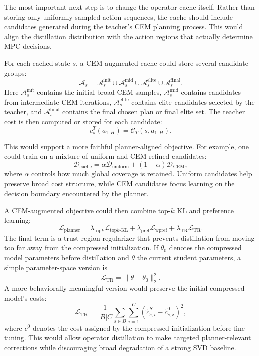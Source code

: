 \documentclass[11pt]{article}
\begin{document}
The most important next step is to change the operator cache itself. Rather than storing only uniformly sampled action sequences, the cache should include candidates generated during the teacher's CEM planning process. This would align the distillation distribution with the action regions that actually determine MPC decisions.

For each cached state \(s\), a CEM-augmented cache could store several candidate groups:
\[
    \mathcal{A}_s
    =
    \mathcal{A}^{\mathrm{init}}_s
    \cup
    \mathcal{A}^{\mathrm{mid}}_s
    \cup
    \mathcal{A}^{\mathrm{elite}}_s
    \cup
    \mathcal{A}^{\mathrm{final}}_s.
\]
Here \(\mathcal{A}^{\mathrm{init}}_s\) contains the initial broad CEM samples, \(\mathcal{A}^{\mathrm{mid}}_s\) contains candidates from intermediate CEM iterations, \(\mathcal{A}^{\mathrm{elite}}_s\) contains elite candidates selected by the teacher, and \(\mathcal{A}^{\mathrm{final}}_s\) contains the final chosen plan or final elite set. The teacher cost is then computed or stored for each candidate:
\[
    c^T_s(a_{1:H})
    =
    \mathcal{C}_T(s, a_{1:H}).
\]

This would support a more faithful planner-aligned objective. For example, one could train on a mixture of uniform and CEM-refined candidates:
\[
    \mathcal{D}_{\mathrm{cache}}
    =
    \alpha \mathcal{D}_{\mathrm{uniform}}
    +
    (1-\alpha)\mathcal{D}_{\mathrm{CEM}},
\]
where \(\alpha\) controls how much global coverage is retained. Uniform candidates help preserve broad cost structure, while CEM candidates focus learning on the decision boundary encountered by the planner.

A CEM-augmented objective could then combine top-\(k\) KL and preference learning:
\[
    \mathcal{L}_{\mathrm{planner}}
    =
    \lambda_{\mathrm{top}k}
    \mathcal{L}_{\mathrm{top}k\text{-}\mathrm{KL}}
    +
    \lambda_{\mathrm{pref}}
    \mathcal{L}_{\mathrm{wpref}}
    +
    \lambda_{\mathrm{TR}}
    \mathcal{L}_{\mathrm{TR}}.
\]
The final term is a trust-region regularizer that prevents distillation from moving too far away from the compressed initialization. If \(\theta_0\) denotes the compressed model parameters before distillation and \(\theta\) the current student parameters, a simple parameter-space version is
\[
    \mathcal{L}_{\mathrm{TR}}
    =
    \|\theta - \theta_0\|_2^2.
\]
A more behaviorally meaningful version would preserve the initial compressed model's costs:
\[
    \mathcal{L}_{\mathrm{TR}}
    =
    \frac{1}{|B|C}
    \sum_{s \in B}
    \sum_{i=1}^{C}
    \left(
        \widetilde{c}^{S}_{s,i}
        -
        \widetilde{c}^{0}_{s,i}
    \right)^2,
\]
where \(c^0\) denotes the cost assigned by the compressed initialization before fine-tuning. This would allow operator distillation to make targeted planner-relevant corrections while discouraging broad degradation of a strong SVD baseline.
\end{document}
